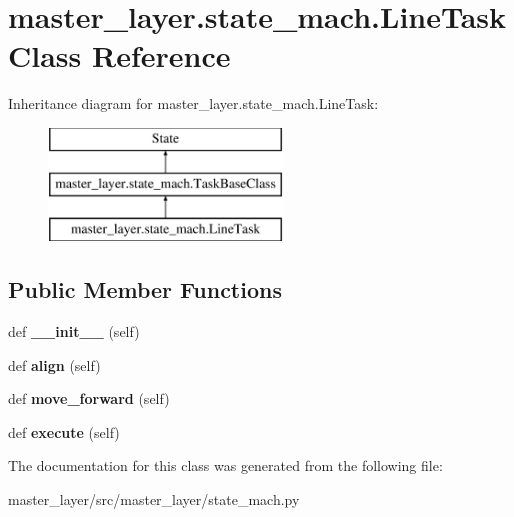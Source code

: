 \hypertarget{classmaster__layer_1_1state__mach_1_1LineTask}{}\section{master\+\_\+layer.\+state\+\_\+mach.\+Line\+Task Class Reference}
\label{classmaster__layer_1_1state__mach_1_1LineTask}
Inheritance diagram for master\+\_\+layer.\+state\+\_\+mach.\+Line\+Task\+:\begin{figure}[H]
\begin{center}
\leavevmode
\includegraphics[height=3.000000cm]{classmaster__layer_1_1state__mach_1_1LineTask}
\end{center}
\end{figure}
\subsection*{Public Member Functions}
\begin{DoxyCompactItemize}
\item 
\mbox{\label{classmaster__layer_1_1state__mach_1_1LineTask_a29ab835b684e081ac57da871385d5d3c}} 
def {\bfseries \+\_\+\+\_\+init\+\_\+\+\_\+} (self)
\item 
\mbox{\label{classmaster__layer_1_1state__mach_1_1LineTask_a13274219ef37814fec9db88097ca612b}} 
def {\bfseries align} (self)
\item 
\mbox{\label{classmaster__layer_1_1state__mach_1_1LineTask_a1ac0acf2d0ec2c8cec80371f644c8d7b}} 
def {\bfseries move\+\_\+forward} (self)
\item 
\mbox{\label{classmaster__layer_1_1state__mach_1_1LineTask_a14c494a0b2dbe034ab1e0d9e55e71608}} 
def {\bfseries execute} (self)
\end{DoxyCompactItemize}


The documentation for this class was generated from the following file\+:\begin{DoxyCompactItemize}
\item 
master\+\_\+layer/src/master\+\_\+layer/state\+\_\+mach.\+py\end{DoxyCompactItemize}
